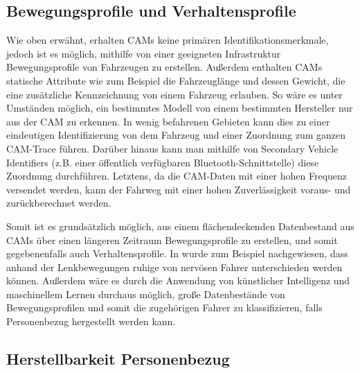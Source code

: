 \subsection{Bewegungsprofile und Verhaltensprofile}
\label{sec:SecondContentSection:SecondSubsection:FirstSubSubsection}

Wie oben erwähnt, erhalten CAMs keine primären Identifikationsmerkmale, jedoch ist es möglich, mithilfe von einer geeigneten Infrastruktur Bewegungsprofile von Fahrzeugen zu erstellen. Außerdem enthalten CAMs statische Attribute wie zum Beispiel die Fahrzeuglänge und dessen Gewicht, die eine zusätzliche Kennzeichnung von einem Fahrzeug erlauben. So wäre es unter Umständen möglich, ein bestimmtes Modell von einem bestimmten Hersteller nur aus der CAM zu erkennen. In wenig befahrenen Gebieten kann dies zu einer eindeutigen Identifizierung von dem Fahrzeug und einer Zuordnung zum ganzen CAM-Trace führen. Darüber hinaus kann man mithilfe von Secondary Vehicle Identifiers (z.B. einer öffentlich verfügbaren Bluetooth-Schnittstelle) diese Zuordnung durchführen. Letztens, da die CAM-Daten mit einer hohen Frequenz versendet werden, kann der Fahrweg mit einer hohen Zuverlässigkeit voraus- und zurückberechnet werden. 

Somit ist es grundsätzlich möglich, aus einem flächendeckenden Datenbestand aus CAMs über einen längeren Zeitraum Bewegungsprofile zu erstellen, und somit gegebenenfalls auch Verhaltensprofile. In \cite{Dettki2005} wurde zum Beispiel nachgewiesen, dass anhand der Lenkbewegungen ruhige von nervösen Fahrer unterschieden werden können. Außerdem wäre es durch die Anwendung von künstlicher Intelligenz und maschinellem Lernen durchaus möglich, große Datenbestände von Bewegungsprofilen und somit die zugehörigen Fahrer zu klassifizieren, falls Personenbezug hergestellt werden kann. 


\subsection{Herstellbarkeit Personenbezug}
\label{sec:SecondContentSection:SecondSubsection:SecondSubSubsection}

